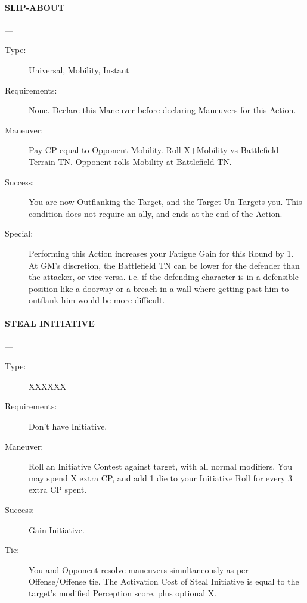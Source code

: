 \documentclass[oneside,11pt,english]{book}
\begin{document}
\paragraph{\large\label{man:SLIP-ABOUT} SLIP-ABOUT}---
\vspace{-10pt}\begin{description} \item [Type:] Universal, Mobility, Instant 
\item [Requirements:] None. Declare this Maneuver before declaring Maneuvers for this Action. 
\item [Maneuver:] Pay CP equal to Opponent Mobility. Roll X$ + $Mobility vs Battlefield Terrain TN. Opponent rolls Mobility at Battlefield TN. 
\item [Success:] You are now Outflanking the Target, and the Target Un-Targets you. This condition does not 
require an ally, and ends at the end of the Action. 
\item [Special:] Performing this Action increases your Fatigue Gain for this Round by 1. 
At GM’s discretion, the Battlefield TN can be lower for the defender than the attacker, or vice-versa. i.e. 
if the defending character is in a defensible position like a doorway or a breach in a wall where getting 
past him to outflank him would be more difficult. 
\end{description}
\paragraph{\large\label{man:STEAL INITIATIVE} STEAL INITIATIVE}---
\vspace{-10pt}\begin{description} 
\item [Type:] XXXXXX 
\item [Requirements:] Don't have Initiative. 
\item [Maneuver:] Roll an Initiative Contest against target, with all normal modifiers. You may spend X extra 
CP, and add 1 die to your Initiative Roll for every 3 extra CP spent. 
\item [Success:] Gain Initiative. 
\item [Tie:] You and Opponent resolve maneuvers simultaneously as-per Offense/Offense tie. 
The Activation Cost of Steal Initiative is equal to the target's modified Perception score, plus optional X. 
\end{description}
\end{document}
